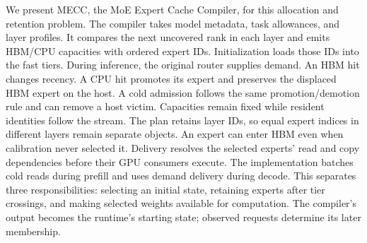\documentclass[conference,9pt,letterpaper]{IEEEtran}
\newcommand{\mecc}{\textsc{MECC}}
\begin{document}
We present \mecc{}, the MoE Expert Cache Compiler, for this allocation and retention problem. The compiler takes model metadata, task allowances, and layer profiles. It compares the next uncovered rank in each layer and emits HBM/CPU capacities with ordered expert IDs. Initialization loads those IDs into the fast tiers. During inference, the original router supplies demand. An HBM hit changes recency. A CPU hit promotes its expert and preserves the displaced HBM expert on the host. A cold admission follows the same promotion/demotion rule and can remove a host victim. Capacities remain fixed while resident identities follow the stream. The plan retains layer IDs, so equal expert indices in different layers remain separate objects. An expert can enter HBM even when calibration never selected it. Delivery resolves the selected experts' read and copy dependencies before their GPU consumers execute. The implementation batches cold reads during prefill and uses demand delivery during decode. This separates three responsibilities: selecting an initial state, retaining experts after tier crossings, and making selected weights available for computation. The compiler's output becomes the runtime's starting state; observed requests determine its later membership.
\end{document}
